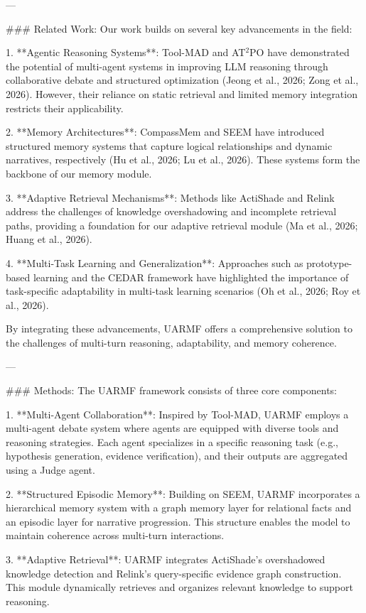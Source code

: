 ---

### Related Work:
Our work builds on several key advancements in the field:

1. **Agentic Reasoning Systems**: Tool-MAD and AT$^2$PO have demonstrated the potential of multi-agent systems in improving LLM reasoning through collaborative debate and structured optimization (Jeong et al., 2026; Zong et al., 2026). However, their reliance on static retrieval and limited memory integration restricts their applicability.

2. **Memory Architectures**: CompassMem and SEEM have introduced structured memory systems that capture logical relationships and dynamic narratives, respectively (Hu et al., 2026; Lu et al., 2026). These systems form the backbone of our memory module.

3. **Adaptive Retrieval Mechanisms**: Methods like ActiShade and Relink address the challenges of knowledge overshadowing and incomplete retrieval paths, providing a foundation for our adaptive retrieval module (Ma et al., 2026; Huang et al., 2026).

4. **Multi-Task Learning and Generalization**: Approaches such as prototype-based learning and the CEDAR framework have highlighted the importance of task-specific adaptability in multi-task learning scenarios (Oh et al., 2026; Roy et al., 2026).

By integrating these advancements, UARMF offers a comprehensive solution to the challenges of multi-turn reasoning, adaptability, and memory coherence.

---

### Methods:
The UARMF framework consists of three core components:

1. **Multi-Agent Collaboration**: Inspired by Tool-MAD, UARMF employs a multi-agent debate system where agents are equipped with diverse tools and reasoning strategies. Each agent specializes in a specific reasoning task (e.g., hypothesis generation, evidence verification), and their outputs are aggregated using a Judge agent.

2. **Structured Episodic Memory**: Building on SEEM, UARMF incorporates a hierarchical memory system with a graph memory layer for relational facts and an episodic layer for narrative progression. This structure enables the model to maintain coherence across multi-turn interactions.

3. **Adaptive Retrieval**: UARMF integrates ActiShade's overshadowed knowledge detection and Relink's query-specific evidence graph construction. This module dynamically retrieves and organizes relevant knowledge to support reasoning.

